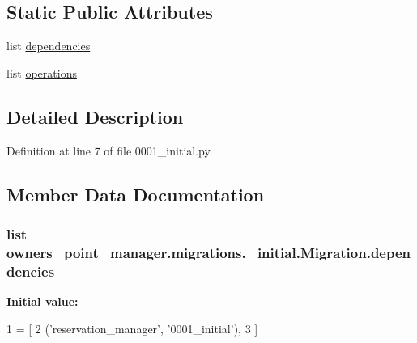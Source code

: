 \subsection*{Static Public Attributes}
\begin{DoxyCompactItemize}
\item 
list \hyperlink{classowners__point__manager_1_1migrations_1_10001__initial_1_1Migration_a71a0f81128f1a648d682ea78293a7fa5}{dependencies}
\item 
list \hyperlink{classowners__point__manager_1_1migrations_1_10001__initial_1_1Migration_a2f1f70b01d6da09085a0a645cfbde222}{operations}
\end{DoxyCompactItemize}


\subsection{Detailed Description}


Definition at line 7 of file 0001\-\_\-initial.\-py.



\subsection{Member Data Documentation}
\hypertarget{classowners__point__manager_1_1migrations_1_10001__initial_1_1Migration_a71a0f81128f1a648d682ea78293a7fa5}{
\subsubsection[{dependencies}]{\setlength{\rightskip}{0pt plus 5cm}list owners\-\_\-point\-\_\-manager.\-migrations.\-\_\-initial.\-Migration.\-dependencies\hspace{0.3cm}{\ttfamily [static]}}}\label{classowners__point__manager_1_1migrations_1_10001__initial_1_1Migration_a71a0f81128f1a648d682ea78293a7fa5}
{\bfseries Initial value\-:}
\begin{DoxyCode}
1 = [
2         (\textcolor{stringliteral}{'reservation\_manager'}, \textcolor{stringliteral}{'0001\_initial'}),
3     ]
\end{DoxyCode}


